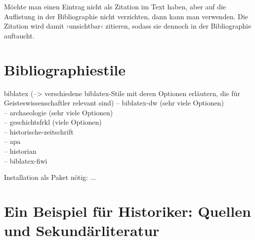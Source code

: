 Möchte man einen Eintrag nicht als Zitation im Text haben, 
aber auf die Auflistung in der Bibliographie nicht verzichten,
dann kann man  verwenden.
Die Zitation wird damit ›unsichtbar‹ zitieren, sodass sie dennoch in der Bibliographie auftaucht.




\section{Bibliographiestile}

biblatex (--> verschiedene biblatex-Stile mit deren Optionen erläutern, die für Geisteswissenschaftler relevant sind)
-- biblatex-dw (sehr viele Optionen)\\
-- archaeologie (sehr viele Optionen)\\
-- geschichtsfrkl (viele Optionen)\\
-- historische-zeitschrift\\
-- apa\\
-- historian\\
-- biblatex-fiwi\\


Installation als Paket nötig:
...



\section{Ein Beispiel für Historiker: Quellen und Sekundärliteratur}




\begin{lfgwcode}{}
\printbibliography[%
  heading=subbibliography,
  keyword=ancient,%
  title={Antike Quellen}]
\end{lfgwcode}

\begin{lfgwcode}{}
\printbibliography[%
  heading=subbibliography,
  keyword=corpus,%
  title={Abkürzungen und Sigel}]

\printbibliography[%
  heading=subbibliography,
  notkeyword=ancient,%
  notkeyword=corpus,%
  title={Sekundärliteratur}]
\end{lfgwcode}

